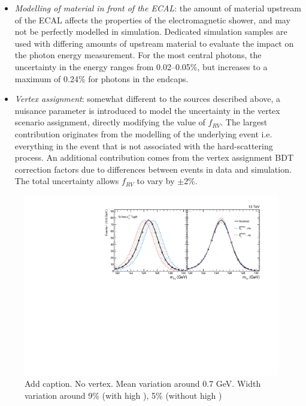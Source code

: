 \begin{itemize}
    \item \textit{Modelling of material in front of the ECAL}: the amount of material upstream of the ECAL affects the properties of the electromagnetic shower, and may not be perfectly modelled in simulation. Dedicated simulation samples are used with differing amounts of upstream material to evaluate the impact on the photon energy measurement. For the most central photons, the uncertainty in the energy ranges from 0.02--0.05\%, but increases to a maximum of 0.24\% for photons in the endcaps.
    
    \item \textit{Vertex assignment}: somewhat different to the sources described above, a nuisance parameter is introduced to model the uncertainty in the vertex scenario assignment, directly modifying the value of $f_{RV}$. The largest contribution originates from the modelling of the underlying event i.e. everything in the event that is not associated with the hard-scattering process. An additional contribution comes from the vertex assignment BDT correction factors due to differences between \Zmumu events in data and simulation. The total uncertainty allows $f_{RV}$ to vary by $\pm$2\%.
\end{itemize}

\begin{figure}[hptb]
  \centering
  \includegraphics[width=1\textwidth]{Figures/hgg_stats/shapeSyst_dropHighR9.pdf}
  \caption[Signal shape systematic uncertainties]
  {
    Add caption. No vertex. Mean variation around 0.7 GeV. Width variation around 9\% (with high \RNINE), 5\% (without high \RNINE)
  }
  \label{fig:systematics_sigshape}
\end{figure}


